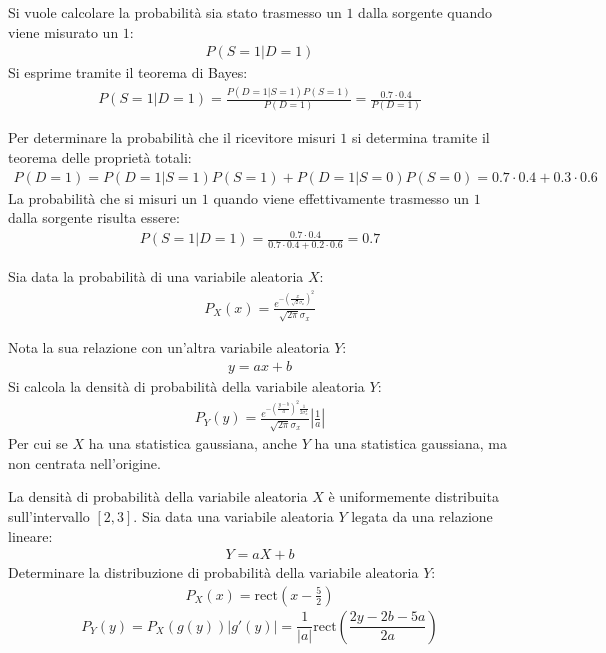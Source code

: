 \documentclass{article}
\begin{document}
Si vuole calcolare la probabilità sia stato trasmesso un $1$ dalla sorgente quando viene misurato un $1$:
\begin{gather*}
    P(S=1|D=1)
\end{gather*}
Si esprime tramite il teorema di Bayes:
\begin{gather*}
    P(S=1|D=1)=\displaystyle\frac{P(D=1|S=1)P(S=1)}{P(D=1)}=\frac{0.7\cdot0.4}{P(D=1)}
\end{gather*}

Per determinare la probabilità che il ricevitore misuri $1$ si determina tramite il teorema delle proprietà totali:
\begin{gather*}
    P(D=1)=P(D=1|S=1)P(S=1)+P(D=1|S=0)P(S=0)=0.7\cdot0.4+0.3\cdot0.6
\end{gather*}
La probabilità che si misuri un $1$ quando viene effettivamente trasmesso un $1$ dalla sorgente risulta essere:
\begin{gather}
    P(S=1|D=1)=\displaystyle\frac{0.7\cdot0.4}{0.7\cdot0.4+0.2\cdot0.6}=0.7
\end{gather}


Sia data la probabilità di una variabile aleatoria $X$:
\begin{gather*}
    P_X(x)=\displaystyle\frac{e^{-\left(\frac{x}{\sqrt{2}{\sigma_x}}\right)^2}}{\sqrt{2\pi}\sigma_x}
\end{gather*}

Nota la sua relazione con un'altra variabile aleatoria $Y$:
\begin{gather*}
    y=ax+b
\end{gather*}
Si calcola la densità di probabilità della variabile aleatoria $Y$:
\begin{gather}
    P_Y(y)=\displaystyle\frac{e^{-\left(\frac{y-b}{a}\right)^2\frac{1}{2\sigma_x^2}}}{\sqrt{2\pi}\sigma_x}\left|\frac{1}{a}\right|
\end{gather}
Per cui se $X$ ha una statistica gaussiana, anche $Y$ ha una statistica gaussiana, ma non centrata nell'origine. 



La densità di probabilità della variabile aleatoria $X$ è uniformemente distribuita sull'intervallo $[2,3]$. Sia data una variabile aleatoria $Y$ legata da una relazione 
lineare:
\begin{gather*}
    Y=aX+b
\end{gather*}
Determinare la distribuzione di probabilità della variabile aleatoria $Y$:
\begin{gather*}
    P_X(x)=\mbox{rect}\left(x-\displaystyle\frac{5}{2}\right)
\end{gather*}
\begin{equation}
    P_Y(y)=P_X(g(y))|g'(y)|=\displaystyle\frac{1}{|a|}\mbox{rect}\left(\frac{2y-2b-5a}{2a}\right)
\end{equation}
\end{document}
